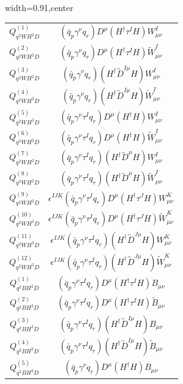 \begin{table}[H]
\begin{center}
\begin{adjustbox}{width=0.91\textwidth,center}
\begin{minipage}[t]{6.3cm}
\begin{tabular}[t]{c|c}
%
$Q_{q^2WH^2D}^{(1)}$  &  $(\bar{q}_p \gamma^\nu q_r) D^{\mu} (H^\dag \tau^I H) W_{\mu\nu}^I$ \\
%
$Q_{q^2WH^2D}^{(2)}$  &  $(\bar{q}_p \gamma^\nu q_r) D^{\mu} (H^\dag \tau^I H) \widetilde W_{\mu\nu}^I$ \\
%
$Q_{q^2WH^2D}^{(3)}$  &  $(\bar{q}_p \gamma^\nu q_r) (H^\dag \overleftrightarrow{D}^{I\mu} H) W_{\mu\nu}^I$ \\
%
$Q_{q^2WH^2D}^{(4)}$  &  $(\bar{q}_p \gamma^\nu q_r) (H^\dag \overleftrightarrow{D}^{I\mu} H) \widetilde W_{\mu\nu}^I$ \\
%
$Q_{q^2WH^2D}^{(5)}$  &  $(\bar{q}_p \gamma^\nu \tau^I q_r) D^{\mu} (H^\dag H) W_{\mu\nu}^I$ \\
%
$Q_{q^2WH^2D}^{(6)}$  &  $(\bar{q}_p \gamma^\nu \tau^I q_r) D^{\mu} (H^\dag H) \widetilde W_{\mu\nu}^I$ \\
%
$Q_{q^2WH^2D}^{(7)}$  &  $(\bar{q}_p \gamma^\nu \tau^I q_r) (H^\dag \overleftrightarrow{D}^\mu H) W_{\mu\nu}^I$ \\
%
$Q_{q^2WH^2D}^{(8)}$  &  $(\bar{q}_p \gamma^\nu \tau^I q_r) (H^\dag \overleftrightarrow{D}^\mu H) \widetilde W_{\mu\nu}^I$ \\
%
$Q_{q^2WH^2D}^{(9)}$  &  $\epsilon^{IJK} (\bar{q}_p \gamma^\nu \tau^I q_r) D^{\mu} (H^\dag \tau^J H) W_{\mu\nu}^K$ \\
%
$Q_{q^2WH^2D}^{(10)}$  &  $\epsilon^{IJK} (\bar{q}_p \gamma^\nu \tau^I q_r) D^{\mu} (H^\dag \tau^J H) \widetilde W_{\mu\nu}^K$ \\
%
$Q_{q^2WH^2D}^{(11)}$  &  $\epsilon^{IJK} (\bar{q}_p \gamma^\nu \tau^I q_r) (H^\dag \overleftrightarrow{D}^{J\mu} H) W_{\mu\nu}^K$ \\
%
$Q_{q^2WH^2D}^{(12)}$  &  $\epsilon^{IJK} (\bar{q}_p \gamma^\nu \tau^I q_r) (H^\dag \overleftrightarrow{D}^{J\mu} H) \widetilde W_{\mu\nu}^K$ \\
%
$Q_{q^2BH^2D}^{(1)}$  &  $(\bar{q}_p \gamma^\nu \tau^I q_r) D^{\mu} (H^\dag \tau^I H) B_{\mu\nu}$ \\
%
$Q_{q^2BH^2D}^{(2)}$  &  $(\bar{q}_p \gamma^\nu \tau^I q_r) D^{\mu} (H^\dag \tau^I H) \widetilde B_{\mu\nu}$ \\
%
$Q_{q^2BH^2D}^{(3)}$  &  $(\bar{q}_p \gamma^\nu \tau^I q_r) (H^\dag \overleftrightarrow{D}^{I\mu} H) B_{\mu\nu}$ \\
%
$Q_{q^2BH^2D}^{(4)}$  &  $(\bar{q}_p \gamma^\nu \tau^I q_r) (H^\dag \overleftrightarrow{D}^{I\mu} H) \widetilde B_{\mu\nu}$ \\
%
$Q_{q^2BH^2D}^{(5)}$  &  $(\bar{q}_p \gamma^\nu q_r) D^{\mu} (H^\dag H) B_{\mu\nu}$ \\

\end{tabular}
\end{minipage}
\end{adjustbox}
\end{center}
\end{table}
